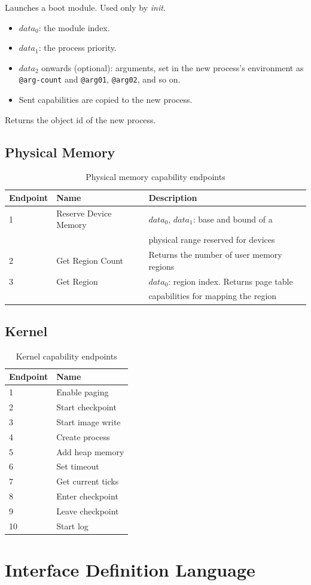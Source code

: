 Launches a boot module.  Used only by {\em init}.

\begin{itemize}
    \item $data_0$: the module index.
    \item $data_1$: the process priority.
    \item $data_2$ onwards (optional): arguments, set in the new process's environment as {\tt @arg-count} and {\tt @arg01}, {\tt @arg02}, and so on.
    \item Sent capabilities are copied to the new process.
\end{itemize}

Returns the object id of the new process.

\subsection{Physical Memory}

\begin{table}[ht]
\begin{tabular}{l l l}
\hline\hline
Endpoint & Name & Description \\ [0.5ex]
\hline
1 & Reserve Device Memory & $data_0$, $data_1$: base and bound of a \\
  &                       & physical range reserved for devices \\
2 & Get Region Count      & Returns the number of user memory regions \\
3 & Get Region            & $data_0$: region index.  Returns page table \\
  &                       & capabilities for mapping the region \\
\hline
\end{tabular}
\caption{Physical memory capability endpoints}
\label{table:physical_memory_caps}
\end{table}

\subsection{Kernel}

\begin{table}[ht]
\begin{tabular}{l l}
\hline\hline
Endpoint & Name \\ [0.5ex]
\hline
1  & Enable paging \\
2  & Start checkpoint \\
3  & Start image write \\
4  & Create process \\
5  & Add heap memory \\
6  & Set timeout \\
7  & Get current ticks \\
8  & Enter checkpoint \\
9  & Leave checkpoint \\
10 & Start log \\
\hline
\end{tabular}
\caption{Kernel capability endpoints}
\label{table:kernel_caps}
\end{table}

\section{Interface Definition Language}

